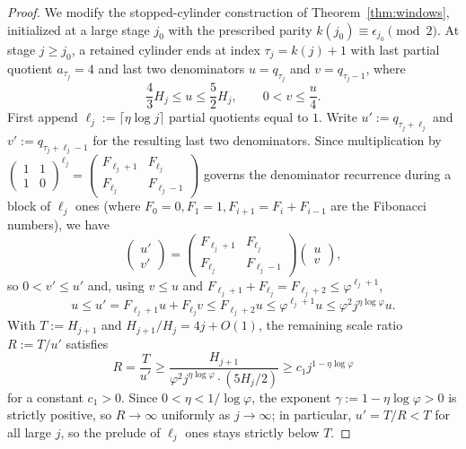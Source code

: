 \begin{proof}
We modify the stopped-cylinder construction of Theorem~\ref{thm:windows},
initialized at a large stage $j_0$ with the prescribed parity
$k(j_0)\equiv\epsilon_{j_0}\pmod2$. At stage $j\ge j_0$, a retained cylinder ends
at index $\tau_j=k(j)+1$ with last partial quotient $a_{\tau_j}=4$ and last two
denominators $u=q_{\tau_j}$ and $v=q_{\tau_j-1}$, where
\[
\frac43 H_j\le u\le\frac52 H_j,\qquad 0<v\le\frac{u}{4}.
\]
First append $\ell_j:=\lceil\eta\log j\rceil$ partial quotients equal to $1$.
Write $u':=q_{\tau_j+\ell_j}$ and $v':=q_{\tau_j+\ell_j-1}$ for the resulting
last two denominators. Since multiplication by $\begin{pmatrix}1 & 1\\ 1 & 0\end{pmatrix}^{\ell_j}
=\begin{pmatrix}F_{\ell_j+1} & F_{\ell_j}\\ F_{\ell_j} & F_{\ell_j-1}\end{pmatrix}$
governs the denominator recurrence during a block of $\ell_j$ ones (where
$F_0=0,F_1=1,F_{i+1}=F_i+F_{i-1}$ are the Fibonacci numbers), we have
\[
\begin{pmatrix}u'\\ v'\end{pmatrix}
=\begin{pmatrix}F_{\ell_j+1} & F_{\ell_j}\\ F_{\ell_j} & F_{\ell_j-1}\end{pmatrix}
\begin{pmatrix}u\\ v\end{pmatrix},
\]
so $0<v'\le u'$ and, using $v\le u$ and $F_{\ell_j+1}+F_{\ell_j}=F_{\ell_j+2}\le\varphi^{\ell_j+1}$,
\[
u\le u'=F_{\ell_j+1}u+F_{\ell_j}v\le F_{\ell_j+2}u\le\varphi^{\ell_j+1}u
\le\varphi^2 j^{\eta\log\varphi}u.
\]
With $T:=H_{j+1}$ and $H_{j+1}/H_j=4j+O(1)$, the remaining scale ratio
$R:=T/u'$ satisfies
\[
R=\frac{T}{u'}\ge\frac{H_{j+1}}{\varphi^2 j^{\eta\log\varphi}\cdot(5H_j/2)}
\ge c_1 j^{1-\eta\log\varphi}
\]
for a constant $c_1>0$. Since $0<\eta<1/\log\varphi$, the exponent
$\gamma:=1-\eta\log\varphi>0$ is strictly positive, so $R\to\infty$ uniformly as
$j\to\infty$; in particular, $u'=T/R<T$ for all large $j$, so the prelude of
$\ell_j$ ones stays strictly below $T$.


\end{proof}
